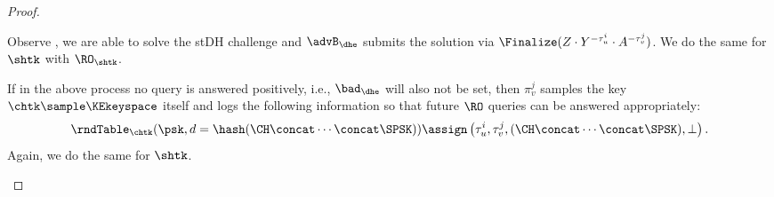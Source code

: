 \begin{proof}
\begin{enumerate}
		Observe , we are able to solve the stDH challenge and $\advB_\dhe$ submits the solution via $\Finalize(Z \cdot Y^{-\tau_u^i} \cdot A^{-\tau_v^j})$.
		We do the same for $\shtk$ with $\RO_{\shtk}$.
		
		If in the above process no query is answered positively, i.e., $\bad_{\dhe}$ will also not be set, then $\pi_v^j$ samples the key $\chtk \sample \KEkeyspace$ itself and logs the following information so that future $\RO$ queries can be answered appropriately:
		\[
		\rndTable_{\chtk}(\psk, d = \hash(\CH \concat \dotsb \concat \SPSK) ) \assign \left(  \tau_u^i, \tau_v^j, (\CH \concat \dotsb \concat \SPSK), \bot \right).
		\]
		Again, we do the same for $\shtk$.
		

\end{enumerate}
\end{proof}
